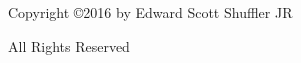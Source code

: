 \thispagestyle{empty}

\begin{center}
{
Copyright \copyright 2016 by Edward Scott Shuffler JR

All Rights Reserved}
\end{center}
